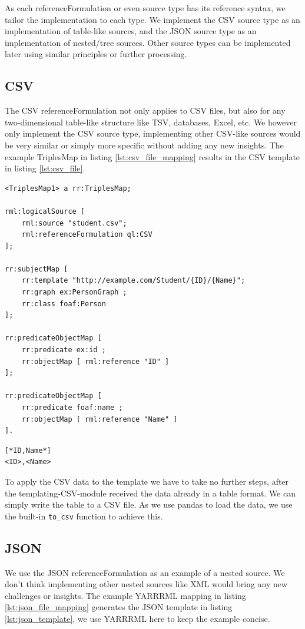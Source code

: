 As each referenceFormulation or even source type has its reference syntax, we tailor the implementation to each type. We implement the CSV source type as an implementation of table-like sources, and the JSON source type as an implementation of nested/tree sources. Other source types can be implemented later using similar principles or further processing.

\subsection{CSV}
\label{subsection:csv}
The CSV referenceFormulation not only applies to CSV files, but also for any two-dimensional table-like structure like TSV, databases, Excel, etc. We however only implement the CSV source type, implementing other CSV-like sources would be very similar or simply more specific without adding any new insights. The example TriplesMap in listing \ref{lst:csv_file_mapping} results in the CSV template in listing \ref{lst:csv_file}.

\begin{lstlisting}[caption={Example mapping for a CSV file}, label={lst:csv_file_mapping}, captionpos=b, basicstyle=\small, float=!ht, frame=single]
<TriplesMap1> a rr:TriplesMap;

rml:logicalSource [
    rml:source "student.csv";
    rml:referenceFormulation ql:CSV
];

rr:subjectMap [ 
    rr:template "http://example.com/Student/{ID}/{Name}";
    rr:graph ex:PersonGraph ;
    rr:class foaf:Person
];

rr:predicateObjectMap [ 
    rr:predicate ex:id ; 
    rr:objectMap [ rml:reference "ID" ]
];

rr:predicateObjectMap [ 
    rr:predicate foaf:name ; 
    rr:objectMap [ rml:reference "Name" ]
].
\end{lstlisting}

\begin{lstlisting}[caption={Example CSV template}, label={lst:csv_file}, captionpos=b, basicstyle=\small, float=!ht, frame=single]
[*ID,Name*]
<ID>,<Name>
\end{lstlisting}

To apply the CSV data to the template we have to take no further steps, after the templating-CSV-module received the data already in a table format. We can simply write the table to a CSV file. As we use pandas to load the data, we use the built-in \texttt{to\_csv} function to achieve this. 

\subsection{JSON}
\label{subsection:json}
We use the JSON referenceFormulation as an example of a nested source. We don't think implementing other nested sources like XML would bring any new challenges or insights. 
The example YARRRML mapping in listing \ref{lst:json_file_mapping} generates the JSON template in listing \ref{lst:json_template}, we use YARRRML here to keep the example concise.

